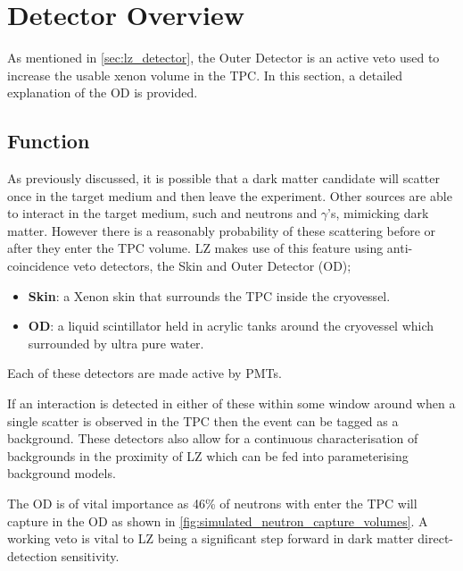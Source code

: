 \section{Detector Overview} \label{OD_detector_overview}
\par
As mentioned in \autoref{sec:lz_detector}, the Outer Detector is an active veto used to increase the usable xenon volume in the TPC.
In this section, a detailed explanation of the OD is provided.

\subsection{Function}
\par
As previously discussed, it is possible that a dark matter candidate will scatter once in the target medium and then leave the experiment.
Other sources are able to interact in the target medium, such and neutrons and $\gamma$'s, mimicking dark matter.
However there is a reasonably probability of these scattering before or after they enter the TPC volume.
LZ makes use of this feature using anti-coincidence veto detectors, the Skin and Outer Detector (OD);
\begin{itemize}
    \item \textbf{Skin}: a Xenon skin that surrounds the TPC inside the cryovessel.
    \item \textbf{OD}: a liquid scintillator held in acrylic tanks around the cryovessel which surrounded by ultra pure water.
\end{itemize}
Each of these detectors are made active by PMTs.
\par
If an interaction is detected in either of these within some window around when a single scatter is observed in the TPC then the event can be tagged as a background.
These detectors also allow for a continuous characterisation of backgrounds in the proximity of LZ which can be fed into parameterising background models.


\par
The OD is of vital importance as 46\% of neutrons with enter the TPC will capture in the OD as shown in \autoref{fig:simulated_neutron_capture_volumes}.
A working veto is vital to LZ being a significant step forward in dark matter direct-detection sensitivity.



